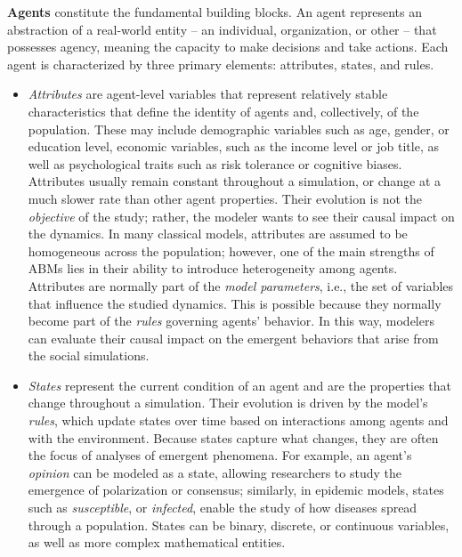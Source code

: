 \documentclass[11pt]{article}
\begin{document}
\smallskip
\noindent \textbf{Agents} constitute the fundamental building blocks. 
An agent represents an abstraction of a real-world entity -- an individual, organization, or other -- that possesses agency, meaning the capacity to make decisions and take actions. 
Each agent is characterized by three primary elements: attributes, states, and rules. 
\begin{itemize}
    \item \textit{Attributes} are agent-level variables that represent relatively stable characteristics that define the identity of agents and, collectively, of the population. 
    These may include demographic variables such as age, gender, or education level, economic variables, such as the income level or job title, as well as psychological traits such as risk tolerance or cognitive biases.  
    Attributes usually remain constant throughout a simulation, or change at a much slower rate than other agent properties. 
    Their evolution is not the \textit{objective} of the study; rather, the modeler wants to see their causal impact on the dynamics. 
    In many classical models, attributes are assumed to be homogeneous across the population; however, one of the main strengths of ABMs lies in their ability to introduce heterogeneity among agents.
    Attributes are normally part of the \textit{model parameters}, i.e., the set of variables that influence the studied dynamics. 
    This is possible because they normally become part of the \textit{rules} governing agents' behavior. 
    In this way, modelers can evaluate their causal impact on the emergent behaviors that arise from the social simulations. 
   
    \item \textit{States} represent the current condition of an agent and are the properties that change throughout a simulation. 
    Their evolution is driven by the model's \textit{rules}, which update states over time based on interactions among agents and with the environment. 
    Because states capture what changes, they are often the focus of analyses of emergent phenomena. 
    For example, an agent's \textit{opinion} can be modeled as a state, allowing researchers to study the emergence of polarization or consensus; similarly, in epidemic models, states such as \textit{susceptible}, or \textit{infected}, enable the study of how diseases spread through a population. 
    States can be binary, discrete, or continuous variables, as well as more complex mathematical entities. 
    

\end{itemize}
\end{document}
